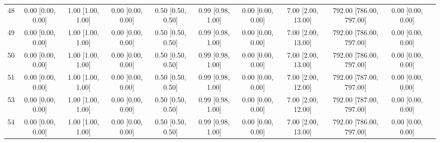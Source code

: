 \documentclass[8pt]{article}
\begin{document}
\begin{center}
\begin{footnotesize}
\begin{longtable}{|ccccccccccc|}
 48 &  0.00 [0.00, 0.00] &  1.00 [1.00, 1.00] &  0.00 [0.00, 0.00] &  0.50 [0.50, 0.50] &  0.99 [0.98, 1.00] &  0.00 [0.00, 0.00] &  7.00 [2.00, 13.00] &  792.00 [786.00, 797.00] &     0.00 [0.00, 0.00] \\
 49 &  0.00 [0.00, 0.00] &  1.00 [1.00, 1.00] &  0.00 [0.00, 0.00] &  0.50 [0.50, 0.50] &  0.99 [0.98, 1.00] &  0.00 [0.00, 0.00] &  7.00 [2.00, 13.00] &  792.00 [786.00, 797.00] &     0.00 [0.00, 0.00] \\
 50 &  0.00 [0.00, 0.00] &  1.00 [1.00, 1.00] &  0.00 [0.00, 0.00] &  0.50 [0.50, 0.50] &  0.99 [0.98, 1.00] &  0.00 [0.00, 0.00] &  7.00 [2.00, 13.00] &  792.00 [786.00, 797.00] &     0.00 [0.00, 0.00] \\
 51 &  0.00 [0.00, 0.00] &  1.00 [1.00, 1.00] &  0.00 [0.00, 0.00] &  0.50 [0.50, 0.50] &  0.99 [0.98, 1.00] &  0.00 [0.00, 0.00] &  7.00 [2.00, 12.00] &  792.00 [787.00, 797.00] &     0.00 [0.00, 0.00] \\
 53 &  0.00 [0.00, 0.00] &  1.00 [1.00, 1.00] &  0.00 [0.00, 0.00] &  0.50 [0.50, 0.50] &  0.99 [0.98, 1.00] &  0.00 [0.00, 0.00] &  7.00 [2.00, 12.00] &  792.00 [787.00, 797.00] &     0.00 [0.00, 0.00] \\
 54 &  0.00 [0.00, 0.00] &  1.00 [1.00, 1.00] &  0.00 [0.00, 0.00] &  0.50 [0.50, 0.50] &  0.99 [0.98, 1.00] &  0.00 [0.00, 0.00] &  7.00 [2.00, 13.00] &  792.00 [786.00, 797.00] &     0.00 [0.00, 0.00] \\
\end{longtable}
\end{footnotesize}
\end{center}
\end{document}
